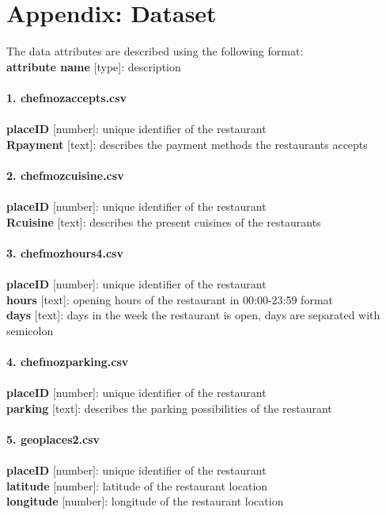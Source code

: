 \appendix

\section{Appendix: Dataset}\label{app:appData}
The data attributes are described using the following format:\\
\textbf{attribute name} [type]: description\\%
\\
\textbf{\large 1. chefmozaccepts.csv}\\
\\
\textbf{placeID} [number]: unique identifier of the restaurant\\
\textbf{Rpayment} [text]: describes the payment methods the restaurants accepts\\
\\
\textbf{\large 2. chefmozcuisine.csv}\\
\\
\textbf{placeID} [number]: unique identifier of the restaurant\\
\textbf{Rcuisine} [text]: describes the present cuisines of the restaurants\\
\\
\textbf{\large 3. chefmozhours4.csv}\\
\\
\textbf{placeID} [number]: unique identifier of the restaurant\\
\textbf{hours} [text]: opening hours of the restaurant in 00:00-23:59 format\\
\textbf{days} [text]: days in the week the restaurant is open, days are separated with semicolon\\
\\
\textbf{\large 4. chefmozparking.csv}\\
\\
\textbf{placeID} [number]: unique identifier of the restaurant\\
\textbf{parking} [text]: describes the parking possibilities of the restaurant\\
\\
\textbf{\large 5. geoplaces2.csv}\\
\\
\textbf{placeID} [number]: unique identifier of the restaurant\\
\textbf{latitude} [number]: latitude of the restaurant location\\
\textbf{longitude} [number]: longitude of the restaurant location\\
